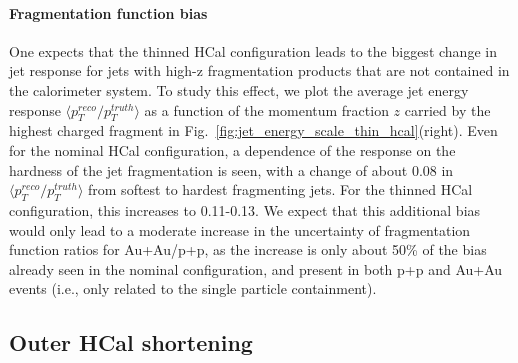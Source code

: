 \paragraph{Fragmentation function bias} 
One expects that the thinned HCal configuration leads to the biggest
change in jet response for jets with high-z fragmentation products
that are not contained in the calorimeter system. To study this
effect, we plot the average jet energy response $\langle
p_T^{reco}/p_T^{truth}\rangle$ as a function of the momentum fraction
$z$ carried by the highest \pt charged fragment in
Fig.~\ref{fig:jet_energy_scale_thin_hcal}(right). Even for the nominal
HCal configuration, a dependence of the response on the hardness of
the jet fragmentation is seen, with a change of about 0.08 in $\langle
p_T^{reco}/p_T^{truth}\rangle$ from softest to hardest fragmenting
jets.  For the thinned HCal configuration, this increases to
0.11-0.13. We expect that this additional bias would only lead to a
moderate increase in the uncertainty of fragmentation function ratios
for Au+Au/p+p, as the increase is only about 50\% of the bias already
seen in the nominal configuration, and present in both p+p and Au+Au
events (i.e., only related to the single particle containment).


\subsection{Outer HCal shortening}

